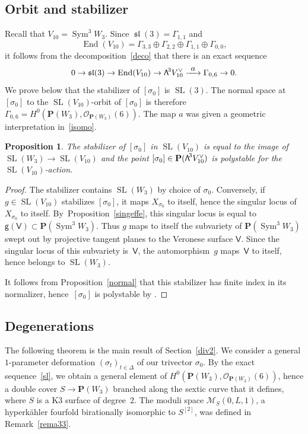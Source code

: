 \documentclass[11pt]{article}
\let\mathcal\mathscr
\newcommand\To[1]{\mathchoice{\xrightarrow{\textstyle\kern4pt#1\kern3pt}}{\stackrel{#1}{\longrightarrow}}{}{}}
\newtheorem{prop}[lemm]{Proposition}
\theoremstyle{definition}
\renewcommand\P{{\mathbf P}}\let\PP\P
\newcommand\cM{\mathcal{M}}
\newcommand\cO{\mathcal{O}}\let\OO\cO
\newcommand\sfg{\mathsf{g}}
\newcommand\sfV{\mathsf{V}}
\newcommand\gv{\sfg(\sfV)}
\DeclareMathOperator{\gsl}{\mathfrak{sl}}
\DeclareMathOperator{\End}{End}
\DeclareMathOperator{\Sym}{Sym}
\DeclareMathOperator{\SL}{SL}
\newcommand\bw[1]{{\hbox{\large$\mathsf{\Lambda}$}^{\!#1}}}
\newcommand\hilbS{S^{[2]}}
\newcommand\hk{hyperkähler\xspace}
\begin{document}
\subsection{Orbit and stabilizer} \label{sect74}
Recall that $V_{10}= \Sym^3\! W_3$.
Since $\gsl(3)=\Gamma_{1,1} $ and
\[
\End(V_{10} )=\Gamma_{3,3} \oplus \Gamma_{2,2}\oplus \Gamma_{1,1}\oplus \Gamma_{0,0}
,
\]
it follows from the decomposition~\eqref{deco} that
there is an exact sequence
\begin{equation}\label{sl}
0\to \gsl(3)\to \End(V_{10})\to \bw3V_{10}^\vee \To{a} \Gamma_{0,6}\to 0.
\end{equation}
We prove below that the stabilizer of $[\sigma_0]$ is $\SL(3)$. The normal space at $[\sigma_0]$ to the $\SL(V_{10})$-orbit of $[\sigma_0]$ is therefore $ \Gamma_{0,6}=H^0(\P(W_3),\cO_{\P(W_3)}(6))$. The map $a$ was given a geometric interpretation in~\eqref{isomo}.

\begin{prop}\label{stabver}
The stabilizer of $[\sigma_0]$ in $\SL(V_{10})$ is equal to the image of $\SL(W_3)\to \SL(V_{10})$ and the point
$[\sigma_0]\in \P(\bw3V_{10}^\vee)$ is polystable for the $\SL(V_{10})$-action.
\end{prop}

\begin{proof}
The stabilizer contains $\SL(W_3)$ by choice of $\sigma_0$. Conversely, if $g\in\SL(V_{10})$ stabilizes $[\sigma_0]$, it maps $X_{\sigma_0}$ to itself, hence the singular locus of $X_{\sigma_0}$ to itself. By~Proposition~\ref{singeffe}, this singular locus is equal to $\gv\subset\PP(\Sym^3\! W_3)$. Thus $g$ maps to itself the subvariety of $\PP(\Sym^3\! W_3)$ swept out by projective tangent planes to the Veronese surface $\sfV$. Since the singular locus of this subvariety is~$\sfV$, the automorphism~$g$ maps~$\sfV$ to itself, hence belongs to $\SL(W_3)$.

It follows from Proposition~\ref{normal} that this stabilizer has finite index in its normalizer, hence~$[\sigma_0]$ is polystable by \cite[Cor.\,3]{luna}.
\end{proof}

\subsection{Degenerations}\label{dimodeg2}

The following theorem is the main result of Section~\ref{div2}. We consider a general $1$-parameter deformation $(\sigma_t)_{t\in \Delta}$ of our trivector $\sigma_0$. By the exact sequence~\eqref{sl}, we obtain a general element of $H^0(\P(W_3),\cO_{\P(W_3)}(6))$, hence a double cover $S\to \P(W_3)$ branched along the sextic curve that it defines, where $S$ is a K3 surface of degree~$2$. The moduli space $\cM_S(0,L,1)$, a \hk fourfold birationally isomorphic to $\hilbS$, was defined in Remark~\ref{rema33}.
\end{document}
